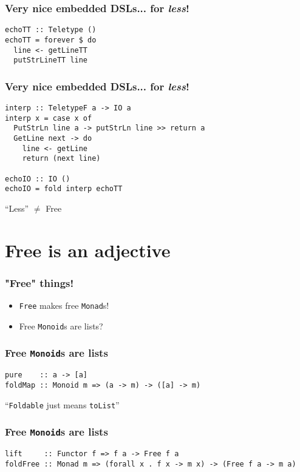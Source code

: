 \documentclass[pdf]{beamer}
\begin{document}
\begin{frame}[fragile]
  \frametitle{Very nice embedded DSLs... for \textit{less}!}
\begin{lstlisting}
echoTT :: Teletype ()
echoTT = forever $ do
  line <- getLineTT
  putStrLineTT line
\end{lstlisting}
\end{frame}

\begin{frame}[fragile]
  \frametitle{Very nice embedded DSLs... for \textit{less}!}
\begin{lstlisting}
interp :: TeletypeF a -> IO a
interp x = case x of
  PutStrLn line a -> putStrLn line >> return a
  GetLine next -> do
    line <- getLine
    return (next line)

echoIO :: IO ()
echoIO = fold interp echoTT
\end{lstlisting}
\end{frame}

\begin{frame}
  ``Less'' $\neq$ Free
\end{frame}


\section{Free is an adjective}

\begin{frame}
  \frametitle{"Free" things!}
  \begin{itemize}
  \item \lstinline{Free} makes free \lstinline{Monad}s! \pause
  \item Free \lstinline{Monoid}s are lists?
  \end{itemize}
\end{frame}

\begin{frame}[fragile]
  \frametitle{Free \texttt{Monoid}s are lists}
\begin{lstlisting}
pure    :: a -> [a]
foldMap :: Monoid m => (a -> m) -> ([a] -> m)
\end{lstlisting}
  \pause  
  ``\lstinline{Foldable} just means \lstinline{toList}''
\end{frame}

\begin{frame}[fragile]
  \frametitle{Free \texttt{Monoid}s are lists}
\begin{lstlisting}
lift     :: Functor f => f a -> Free f a
foldFree :: Monad m => (forall x . f x -> m x) -> (Free f a -> m a)
\end{lstlisting}
\end{frame}
\end{document}
